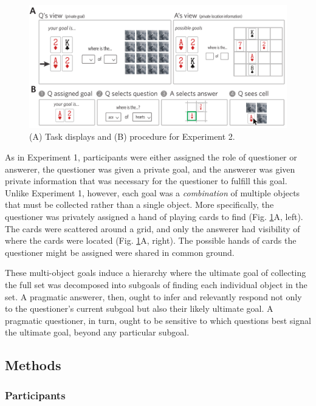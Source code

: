 \documentclass[12pt, floatsintext, jou]{apa6}
\begin{document}
\begin{figure}[tbh!]
\begin{center}
\includegraphics[scale = .7]{Exp2/task.pdf}
\end{center}
\caption{(A) Task displays and (B) procedure for Experiment 2.}
\label{fig:exp2task}
\end{figure}


As in Experiment 1, participants were either assigned the role of questioner or answerer, the questioner was given a private goal, and the answerer was given private information that was necessary for the questioner to fulfill this goal.
Unlike Experiment 1, however, each goal was a \emph{combination} of multiple objects that must be collected rather than a single object.
More specifically, the questioner was privately assigned a hand of playing cards to find (Fig. \ref{fig:exp2task}A, left). 
The cards were scattered around a grid, and only the answerer had visibility of where the cards were located (Fig. \ref{fig:exp2task}A, right).
The possible hands of cards the questioner might be assigned were shared in common ground.

These multi-object goals induce a hierarchy where the ultimate goal of collecting the full set was decomposed into subgoals of finding each individual object in the set.
A pragmatic answerer, then, ought to infer and relevantly respond not only to the questioner's current subgoal but also their likely ultimate goal.
A pragmatic questioner, in turn, ought to be sensitive to which questions best signal the ultimate goal, beyond any particular subgoal.


\subsection{Methods}
\subsubsection{Participants}
\end{document}
